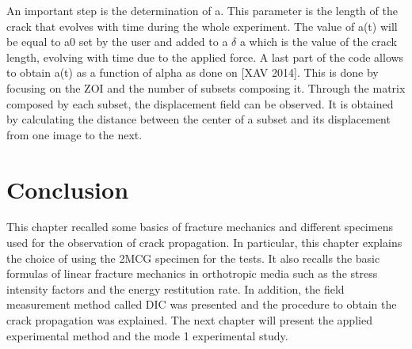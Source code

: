 An important step is the determination of a. This parameter is the length of the crack that evolves with time during the whole experiment.  The value of a(t) will be equal to a0 set by the user and added to a $\delta$ a which is the value of the crack length, evolving with time due to the applied force. A last part of the code allows to obtain a(t) as a function of alpha as done on [XAV 2014]. This is done by focusing on the ZOI and the number of subsets composing it. Through the matrix composed by each subset, the displacement field can be observed. It is obtained by calculating the distance between the center of a subset and its displacement from one image to the next.

\section{Conclusion}

This chapter recalled some basics of fracture mechanics and different specimens used for the observation of crack propagation. In particular, this chapter explains the choice of using the 2MCG specimen for the tests. It also recalls the basic formulas of linear fracture mechanics in orthotropic media such as the stress intensity factors and the energy restitution rate. In addition, the field measurement method called DIC was presented and the procedure to obtain the crack propagation was explained. The next chapter will present the applied experimental method and the mode 1 experimental study.


